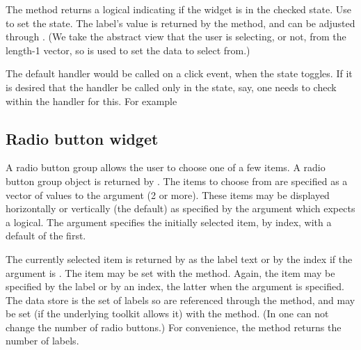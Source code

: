 The  method returns a logical indicating if
the widget is in the checked state. Use  to set
the state. The label's value is returned by the
\method{[}{gcheckbox} method, and can be adjusted through 
\method{[\ASSIGN}{gcheckbox}. (We take the abstract view that the user
is selecting, or not, from the length-1 vector, so \meth{[} is used to
set the data to select from.)

The default handler would be called on a click event, when the state toggles. If it is desired
that the handler be called only in the  state, say, one
needs to check within the handler for this. For example

\begin{Schunk}
\end{Schunk}

\subsection{Radio button widget}
\label{sec:gWidgets-radio-button-widget}

A radio button group allows the user to choose one of a few
items. A radio button group object is returned by
. The items to choose from are specified as a
vector of values to the  argument (2 or more). These items
may be displayed horizontally or vertically (the default) as specified by the
 argument which expects a logical. The
 argument specifies the initially selected
item, by index,
with a default of the first.

The currently selected item is returned by  as
the label text or by the index if the argument  is
. The item may be set with the
 method. Again, the item may be
specified by the label or by an index, the latter when the argument
 is specified. The data store is the set of labels so
are referenced through the \method{[}{gradio} method, and may be set
(if the underlying toolkit allows it) with the
\method{[\ASSIGN}{gradio} method. (In  one can not
change the number of radio buttons.) For convenience, the
 method returns the number of labels.

